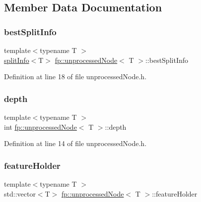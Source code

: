 \subsection{Member Data Documentation}
\mbox{\label{classfp_1_1unprocessedNode_a9146bd750d1f533e712634873551d060}} 
\subsubsection{\texorpdfstring{best\+Split\+Info}{bestSplitInfo}}
{\footnotesize\ttfamily template$<$typename T $>$ \\
\hyperlink{classfp_1_1splitInfo}{split\+Info}$<$T$>$ \hyperlink{classfp_1_1unprocessedNode}{fp\+::unprocessed\+Node}$<$ T $>$\+::best\+Split\+Info\hspace{0.3cm}{\ttfamily [protected]}}



Definition at line 18 of file unprocessed\+Node.\+h.

\mbox{\label{classfp_1_1unprocessedNode_a22ebfbc35a57e2d30b81220c94f4d0d3}} 
\subsubsection{\texorpdfstring{depth}{depth}}
{\footnotesize\ttfamily template$<$typename T $>$ \\
int \hyperlink{classfp_1_1unprocessedNode}{fp\+::unprocessed\+Node}$<$ T $>$\+::depth\hspace{0.3cm}{\ttfamily [protected]}}



Definition at line 14 of file unprocessed\+Node.\+h.

\mbox{\label{classfp_1_1unprocessedNode_adbc4f28ec96b3ac3690cd28e71274bc5}} 
\subsubsection{\texorpdfstring{feature\+Holder}{featureHolder}}
{\footnotesize\ttfamily template$<$typename T $>$ \\
std\+::vector$<$T$>$ \hyperlink{classfp_1_1unprocessedNode}{fp\+::unprocessed\+Node}$<$ T $>$\+::feature\+Holder\hspace{0.3cm}{\ttfamily [protected]}}



